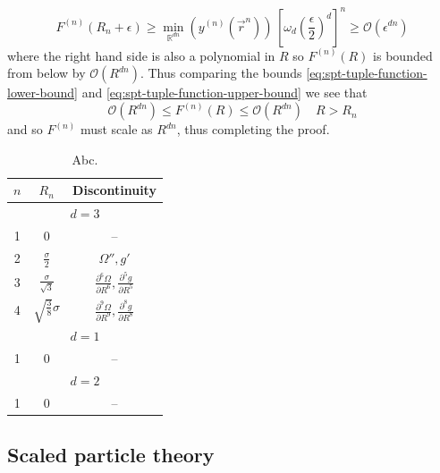 \documentclass[11pt]{report}
\begin{document}
\begin{equation}\label{eq:spt-tuple-function-lower-bound}
  F^{(n)}(R_n+\epsilon) \ge
  \min_{\mathbb{R}^{dn}}{\left(y^{(n)}(\vec{r}^n)\right)}
  \, \left[ \omega_d \left(\frac{\epsilon}{2}\right)^d \right]^n \ge
  \mathcal{O}(\epsilon^{dn})
\end{equation}
where the right hand side is also a polynomial in $R$ so $F^{(n)}(R)$ is bounded from below by $\mathcal{O}(R^{dn})$.
Thus comparing the bounds \eqref{eq:spt-tuple-function-lower-bound} and \eqref{eq:spt-tuple-function-upper-bound} we see that
\begin{equation}
  \mathcal{O}(R^{dn}) \le F^{(n)}(R) \le \mathcal{O}(R^{dn})
  \quad R > R_n
\end{equation}
and so $F^{(n)}$ must scale as $R^{dn}$, thus completing the proof.


\begin{table}
  \begin{minipage}[b]{\linewidth}
  \centering
  \begin{tabular}{ccc}
    \toprule
    $n$ & $R_n$ & Discontinuity \\
    \midrule
    \multicolumn{3}{c}{$d = 3$} \\
    \midrule
    1 & 0 & -- \\
    2 & $\frac{\sigma}{2}$ & $\Omega'', g'$ \\
    3 & $\frac{\sigma}{\sqrt{3}}$ &
    $\frac{\partial^6 \Omega}{\partial R^6}, \frac{\partial^5 g}{\partial R^5}$ \\
    4 & ${\sqrt{\frac{3}{8}}} \sigma$ &
    $\frac{\partial^9 \Omega}{\partial R^9}, \frac{\partial^8 g}{\partial R^8}$ \\
    \multicolumn{3}{c}{$d = 1$} \\
    \midrule
    1 & 0 & -- \\
    \midrule
    \multicolumn{3}{c}{$d = 2$} \\
    \midrule
    1 & 0 & -- \\
    \bottomrule
  \end{tabular}
  \end{minipage}
  \caption{Abc.}
\end{table}

\subsection{Scaled particle theory}
\end{document}
